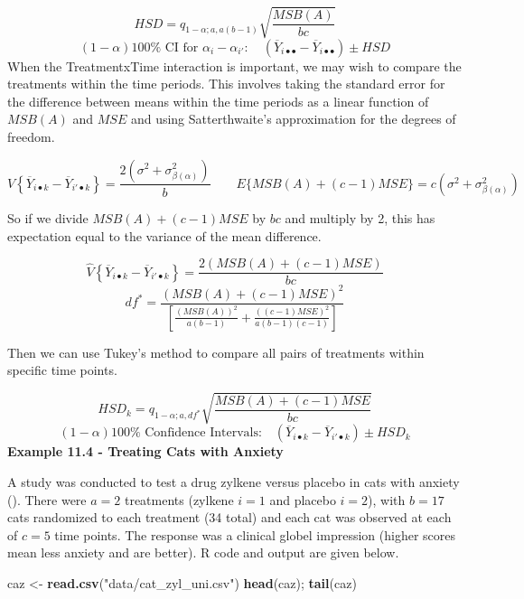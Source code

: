\documentclass[
]{book}
\newenvironment{Shaded}{\begin{snugshade}}{\end{snugshade}}
\newcommand{\FunctionTok}[1]{\textcolor[rgb]{0.13,0.29,0.53}{\textbf{#1}}}
\newcommand{\NormalTok}[1]{#1}
\newcommand{\OtherTok}[1]{\textcolor[rgb]{0.56,0.35,0.01}{#1}}
\newcommand{\StringTok}[1]{\textcolor[rgb]{0.31,0.60,0.02}{#1}}
\begin{document}
\[
HSD = q_{1-\alpha;a,a(b-1)}\sqrt{\frac{MSB(A)}{bc}}
\] \[
(1-\alpha)100\% \mbox{ CI for } \alpha_i-\alpha_{i'}:
\quad
\left(\overline{Y}_{i\bullet\bullet}-
\overline{Y}_{i\bullet\bullet}\right) \pm HSD
\] When the TreatmentxTime interaction is important, we may wish to
compare the treatments within the time periods. This involves taking the
standard error for the difference between means within the time periods
as a linear function of \(MSB(A)\) and \(MSE\) and using Satterthwaite's
approximation for the degrees of freedom.

\[
V\left\{\overline{Y}_{i\bullet k} - 
\overline{Y}_{i'\bullet k}\right\} =
\frac{2\left(\sigma^2+\sigma_{\beta(\alpha)}^2\right)}{b} \qquad
E\{MSB(A)+(c-1)MSE\}=c\left(\sigma^2+\sigma_{\beta(\alpha)}^2\right)
\]

So if we divide \(MSB(A)+(c-1)MSE\) by \(bc\) and multiply by 2, this
has expectation equal to the variance of the mean difference.

\[
\hat{V}\left\{\overline{Y}_{i\bullet k} - 
\overline{Y}_{i'\bullet k}\right\} = 
\frac{2\left(MSB(A)+(c-1)MSE\right)}{bc}
\] \[
df^* = \frac{\left(MSB(A)+(c-1)MSE\right)^2}{
\left[ \frac{\left(MSB(A)\right)^2}{a(b-1)} + 
\frac{\left((c-1)MSE\right)^2}{a(b-1)(c-1)} \right]
}
\]

Then we can use Tukey's method to compare all pairs of treatments within
specific time points.

\[
HSD_k= q_{1-\alpha;a,df^*}\sqrt{\frac{MSB(A)+(c-1)MSE}{bc}}
\] \[
(1-\alpha)100\% \mbox{ Confidence Intervals:} \quad
\left(\overline{Y}_{i\bullet k}-
\overline{Y}_{i'\bullet k}\right) \pm HSD_k
\] \textbf{Example 11.4 - Treating Cats with Anxiety}

A study was conducted to test a drug zylkene versus placebo in cats with
anxiety ().
There were \(a=2\) treatments (zylkene \(i=1\) and placebo \(i=2\)),
with \(b=17\) cats randomized to each treatment (34 total) and each cat
was observed at each of \(c=5\) time points. The response was a clinical
globel impression (higher scores mean less anxiety and are better). R
code and output are given below.

\begin{Shaded}
\begin{Highlighting}[]
\NormalTok{caz }\OtherTok{\textless{}{-}} \FunctionTok{read.csv}\NormalTok{(}\StringTok{"data/cat\_zyl\_uni.csv"}\NormalTok{)}
\FunctionTok{head}\NormalTok{(caz); }\FunctionTok{tail}\NormalTok{(caz)}
\end{Highlighting}
\end{Shaded}
\end{document}
